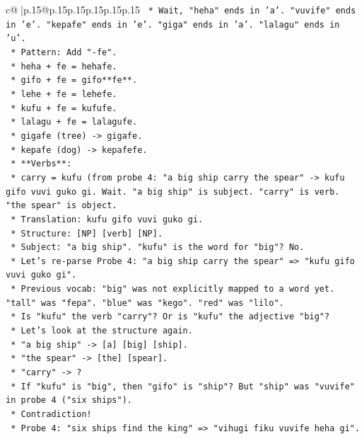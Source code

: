 \documentclass{article}
\begin{document}
{\begin{supertabular}{c@{$\;$}|p{.15\linewidth}@{}p{.15\linewidth}p{.15\linewidth}p{.15\linewidth}p{.15\linewidth}p{.15\linewidth}}
{{{\texttt{        *   Wait, "heha" ends in 'a'. "vuvife" ends in 'e'. "kepafe" ends in 'e'. "giga" ends in 'a'. "lalagu" ends in 'u'.} \\
\texttt{        *   Pattern: Add "{-}fe".} \\
\texttt{        *   heha + fe = hehafe.} \\
\texttt{        *   gifo + fe = gifo**fe**.} \\
\texttt{        *   lehe + fe = lehefe.} \\
\texttt{        *   kufu + fe = kufufe.} \\
\texttt{        *   lalagu + fe = lalagufe.} \\
\texttt{        *   gigafe (tree) {-}> gigafe.} \\
\texttt{        *   kepafe (dog) {-}> kepafefe.} \\
\texttt{    *   **Verbs**:} \\
\texttt{        *   carry = kufu (from probe 4: "a big ship carry the spear" {-}> kufu gifo vuvi guko gi. Wait. "a big ship" is subject. "carry" is verb. "the spear" is object.} \\
\texttt{        *   Translation: kufu gifo vuvi guko gi.} \\
\texttt{        *   Structure: {[}NP{]} {[}verb{]} {[}NP{]}.} \\
\texttt{        *   Subject: "a big ship". "kufu" is the word for "big"? No.} \\
\texttt{        *   Let's re{-}parse Probe 4: "a big ship carry the spear" => "kufu gifo vuvi guko gi".} \\
\texttt{        *   Previous vocab: "big" was not explicitly mapped to a word yet. "tall" was "fepa". "blue" was "kego". "red" was "lilo".} \\
\texttt{        *   Is "kufu" the verb "carry"? Or is "kufu" the adjective "big"?} \\
\texttt{        *   Let's look at the structure again.} \\
\texttt{        *   "a big ship" {-}> {[}a{]} {[}big{]} {[}ship{]}.} \\
\texttt{        *   "the spear" {-}> {[}the{]} {[}spear{]}.} \\
\texttt{        *   "carry" {-}> ?} \\
\texttt{        *   If "kufu" is "big", then "gifo" is "ship"? But "ship" was "vuvife" in probe 4 ("six ships").} \\
\texttt{        *   Contradiction!} \\
\texttt{        *   Probe 4: "six ships find the king" => "vihugi fiku vuvife heha gi".} \\
}}}
\end{supertabular}}
\end{document}
